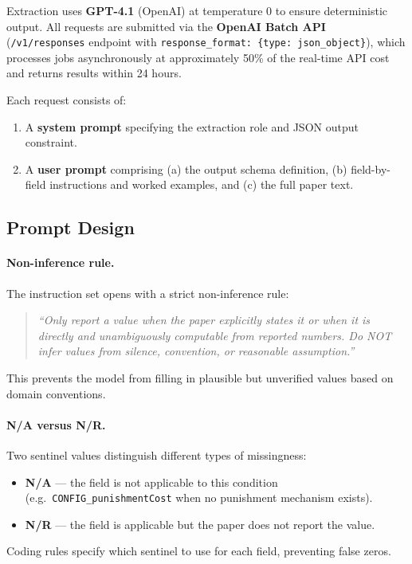 \documentclass[11pt,a4paper]{article}
\begin{document}
Extraction uses \textbf{GPT-4.1} (OpenAI) at temperature 0 to ensure deterministic output. All requests are submitted via the \textbf{OpenAI Batch API} (\texttt{/v1/responses} endpoint with \texttt{response\_format: \{type: json\_object\}}), which processes jobs asynchronously at approximately 50\% of the real-time API cost and returns results within 24 hours.

Each request consists of:
\begin{enumerate}[noitemsep]
  \item A \textbf{system prompt} specifying the extraction role and JSON output constraint.
  \item A \textbf{user prompt} comprising (a) the output schema definition, (b) field-by-field instructions and worked examples, and (c) the full paper text.
\end{enumerate}

\subsection{Prompt Design}

\paragraph{Non-inference rule.}
The instruction set opens with a strict non-inference rule:
\begin{quote}
\textit{``Only report a value when the paper explicitly states it or when it is directly and unambiguously computable from reported numbers. Do NOT infer values from silence, convention, or reasonable assumption.''}
\end{quote}
This prevents the model from filling in plausible but unverified values based on domain conventions.

\paragraph{N/A versus N/R.}
Two sentinel values distinguish different types of missingness:
\begin{itemize}[noitemsep]
  \item \textbf{N/A} — the field is not applicable to this condition (e.g.\ \texttt{CONFIG\_punishmentCost} when no punishment mechanism exists).
  \item \textbf{N/R} — the field is applicable but the paper does not report the value.
\end{itemize}
Coding rules specify which sentinel to use for each field, preventing false zeros.
\end{document}
